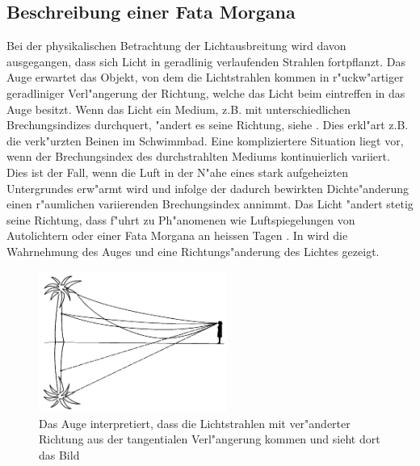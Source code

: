 \subsection{Beschreibung einer Fata Morgana}
Bei der physikalischen Betrachtung der Lichtausbreitung wird davon
ausgegangen, dass sich Licht in
geradlinig verlaufenden Strahlen fortpflanzt. Das Auge erwartet das
Objekt, von dem die Lichtstrahlen
kommen in r"uckw"artiger geradliniger Verl"angerung der Richtung, welche
das Licht beim eintreffen in das Auge besitzt.
Wenn das Licht ein Medium, z.B. mit unterschiedlichen
Brechungsindizes durchquert, "andert es seine Richtung, siehe
. Dies erkl"art z.B. die verk"urzten Beinen im
Schwimmbad.
Eine kompliziertere Situation liegt vor, wenn der Brechungsindex des
durchstrahlten Mediums kontinuierlich variiert. 
Dies ist der Fall, wenn die Luft in der N"ahe eines stark aufgeheizten
Untergrundes erw"armt
wird und infolge der dadurch bewirkten Dichte"anderung einen r"aumlichen
variierenden Brechungsindex annimmt. 
Das Licht "andert stetig seine Richtung, dass f"uhrt zu Ph"anomenen wie
Luftspiegelungen von Autolichtern oder einer Fata Morgana an heissen
Tagen \cite{fataEinleitung}.
In  wird die Wahrnehmung des Auges und eine
Richtungs"anderung des Lichtes gezeigt.
\begin{figure}[h]
\begin{center}
\includegraphics[width=0.55\textwidth]{licht/picture/FataEinleitung.png}
	\caption{Das Auge interpretiert, dass die Lichtstrahlen mit ver"anderter Richtung aus der tangentialen Verl"angerung kommen und sieht dort das Bild}
	\label{Ab:fataEinleitung}
\end{center}	
\end{figure}

